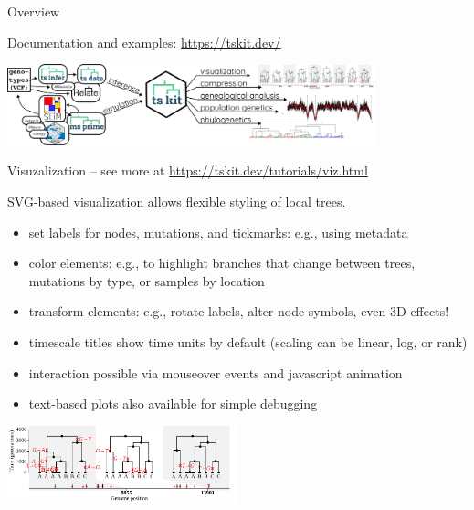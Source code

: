\documentclass[landscape,a0paper,fontscale=0.4]{baposter}
\newcommand{\compresslist}{%
 \setlength{\itemsep}{1pt}%
 \setlength{\parskip}{0pt}%
 \setlength{\parsep}{0pt}%
 }
\begin{document}
\begin{poster}
\begin{posterbox}[name=overview,column=1,row=0,span=2]{Overview}
\begin{multicols}{2}
\end{multicols}

\begin{center} \Large
    Documentation and examples: \url{https://tskit.dev/}

    \vspace{2em}

    \includegraphics[width=0.8\textwidth]{workflow}
\end{center}


\end{posterbox}

\begin{posterbox}[name=viz,column=1,row=0,span=2,below=overview]{Visuzalization -- \textup{see more at \url{https://tskit.dev/tutorials/viz.html}}}


\begin{multicols}{2}

SVG-based visualization allows flexible styling of local trees.

\begin{itemize} \compresslist
    \item set labels for nodes, mutations, and tickmarks: e.g., using metadata
    \item color elements: e.g., to highlight branches that change between trees,
        mutations by type, or samples by location
    \item transform elements: e.g., rotate labels, alter node symbols, even 3D effects!
    \item timescale titles show time units by default (scaling can be linear, log, or rank)
    \item interaction possible via mouseover events and javascript animation
    \item text-based plots also available for simple debugging
\end{itemize}

\begin{center}
\includegraphics[width=0.5\textwidth]{viz_23_0}
\end{center}


\end{multicols}
\end{posterbox}
\end{poster}
\end{document}

